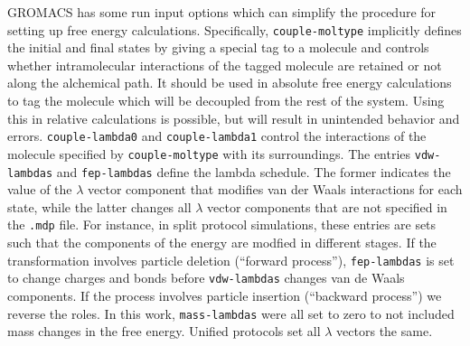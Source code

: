 \documentclass[journal=jctcce,manuscript=article]{achemso}
\newcommand{\inpopt}[1]{\texttt{#1}}
\begin{document}
GROMACS has some run input options which can simplify the procedure 
for setting up free energy calculations.  Specifically, \inpopt{couple-moltype} 
implicitly defines the initial and final states by giving a special tag to a 
molecule and controls whether intramolecular interactions of the tagged 
molecule are retained or not along the alchemical path.  It should be used in 
absolute free energy calculations to tag the molecule which will be decoupled 
from the rest of the system.
Using this in relative calculations is possible, but will result in unintended 
behavior and errors.  \inpopt{couple-lambda0} and 
\inpopt{couple-lambda1} control the interactions of the molecule specified by 
\inpopt{couple-moltype} with its surroundings.
The entries \inpopt{vdw-lambdas} and \inpopt{fep-lambdas} 
define the lambda schedule.  The former indicates the value of the $\lambda$ 
vector component that modifies van der Waals interactions for each state,
while the latter changes all $\lambda$ vector components that are not specified 
in the \inpopt{.mdp} file.  For instance, in split protocol simulations, these 
entries are sets such that the components of the energy are modfied in 
different stages.  If the transformation involves particle deletion (``forward 
process''), \inpopt{fep-lambdas} is set to change charges and bonds
before \inpopt{vdw-lambdas} changes van de Waals components.
If the process involves particle insertion (``backward process'') we reverse 
the roles.  In this work, \inpopt{mass-lambdas} were all set to zero  to not 
included mass changes in the free energy.  Unified protocols set all $\lambda$ 
vectors the same.

\end{document}
